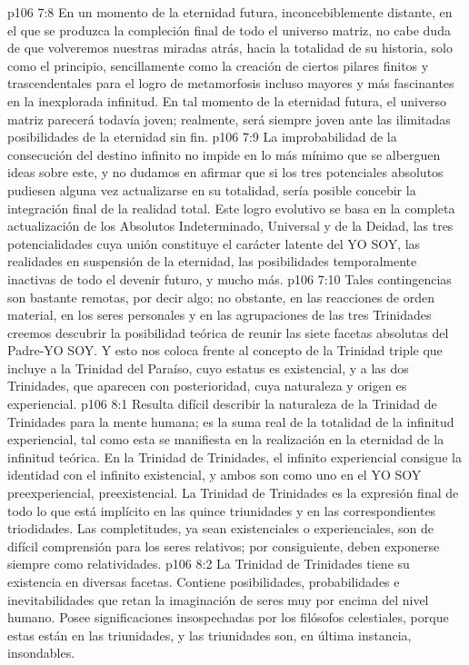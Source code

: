 \vs p106 7:8 En un momento de la eternidad futura, inconcebiblemente distante, en el que se produzca la compleción final de todo el universo matriz, no cabe duda de que volveremos nuestras miradas atrás, hacia la totalidad de su historia, solo como el principio, sencillamente como la creación de ciertos pilares finitos y trascendentales para el logro de metamorfosis incluso mayores y más fascinantes en la inexplorada infinitud. En tal momento de la eternidad futura, el universo matriz parecerá todavía joven; realmente, será siempre joven ante las ilimitadas posibilidades de la eternidad sin fin.
\vs p106 7:9 \pc La improbabilidad de la consecución del destino infinito no impide en lo más mínimo que se alberguen ideas sobre este, y no dudamos en afirmar que si los tres potenciales absolutos pudiesen alguna vez actualizarse en su totalidad, sería posible concebir la integración final de la realidad total. Este logro evolutivo se basa en la completa actualización de los Absolutos Indeterminado, Universal y de la Deidad, las tres potencialidades cuya unión constituye el carácter latente del YO SOY, las realidades en suspensión de la eternidad, las posibilidades temporalmente inactivas de todo el devenir futuro, y mucho más.
\vs p106 7:10 Tales contingencias son bastante remotas, por decir algo; no obstante, en las reacciones de orden material, en los seres personales y en las agrupaciones de las tres Trinidades creemos descubrir la posibilidad teórica de reunir las siete facetas absolutas del Padre\hyp{}YO SOY. Y esto nos coloca frente al concepto de la Trinidad triple que incluye a la Trinidad del Paraíso, cuyo estatus es existencial, y a las dos Trinidades, que aparecen con posterioridad, cuya naturaleza y origen es experiencial.
\vs p106 8:1 Resulta difícil describir la naturaleza de la Trinidad de Trinidades para la mente humana; es la suma real de la totalidad de la infinitud experiencial, tal como esta se manifiesta en la realización en la eternidad de la infinitud teórica. En la Trinidad de Trinidades, el infinito experiencial consigue la identidad con el infinito existencial, y ambos son como uno en el YO SOY preexperiencial, preexistencial. La Trinidad de Trinidades es la expresión final de todo lo que está implícito en las quince triunidades y en las correspondientes triodidades. Las completitudes, ya sean existenciales o experienciales, son de difícil comprensión para los seres relativos; por consiguiente, deben exponerse siempre como relatividades.
\vs p106 8:2 La Trinidad de Trinidades tiene su existencia en diversas facetas. Contiene posibilidades, probabilidades e inevitabilidades que retan la imaginación de seres muy por encima del nivel humano. Posee significaciones insospechadas por los filósofos celestiales, porque estas están en las triunidades, y las triunidades son, en última instancia, insondables.
